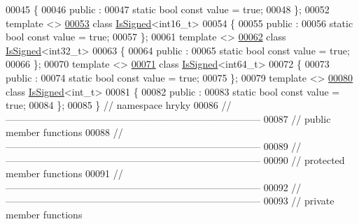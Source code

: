 \begin{DoxyCode}
00045 \{
00046 \textcolor{keyword}{public} :
00047     \textcolor{keyword}{static} \textcolor{keywordtype}{bool} \textcolor{keyword}{const} value = \textcolor{keyword}{true};
00048 \};
00052 \textcolor{keyword}{template} <>
\hypertarget{is__signed_8h_source_l00053}{}\hyperlink{classhryky_1_1_is_signed_3_01int16__t_01_4}{00053} \textcolor{keyword}{class }\hyperlink{classhryky_1_1_is_signed}{IsSigned}<int16\_t>
00054 \{
00055 \textcolor{keyword}{public} :
00056     \textcolor{keyword}{static} \textcolor{keywordtype}{bool} \textcolor{keyword}{const} value = \textcolor{keyword}{true};
00057 \};
00061 \textcolor{keyword}{template} <>
\hypertarget{is__signed_8h_source_l00062}{}\hyperlink{classhryky_1_1_is_signed_3_01int32__t_01_4}{00062} \textcolor{keyword}{class }\hyperlink{classhryky_1_1_is_signed}{IsSigned}<int32\_t>
00063 \{
00064 \textcolor{keyword}{public} :
00065     \textcolor{keyword}{static} \textcolor{keywordtype}{bool} \textcolor{keyword}{const} value = \textcolor{keyword}{true};
00066 \};
00070 \textcolor{keyword}{template} <>
\hypertarget{is__signed_8h_source_l00071}{}\hyperlink{classhryky_1_1_is_signed_3_01int64__t_01_4}{00071} \textcolor{keyword}{class }\hyperlink{classhryky_1_1_is_signed}{IsSigned}<int64\_t>
00072 \{
00073 \textcolor{keyword}{public} :
00074     \textcolor{keyword}{static} \textcolor{keywordtype}{bool} \textcolor{keyword}{const} value = \textcolor{keyword}{true};
00075 \};
00079 \textcolor{keyword}{template} <>
\hypertarget{is__signed_8h_source_l00080}{}\hyperlink{classhryky_1_1_is_signed_3_01int__t_01_4}{00080} \textcolor{keyword}{class }\hyperlink{classhryky_1_1_is_signed}{IsSigned}<int\_t>
00081 \{
00082 \textcolor{keyword}{public} :
00083     \textcolor{keyword}{static} \textcolor{keywordtype}{bool} \textcolor{keyword}{const} value = \textcolor{keyword}{true};
00084 \};
00085 \} \textcolor{comment}{// namespace hryky}
00086 \textcolor{comment}{//
      ------------------------------------------------------------------------------}
00087 \textcolor{comment}{// public member functions}
00088 \textcolor{comment}{//
      ------------------------------------------------------------------------------}
00089 \textcolor{comment}{//
      ------------------------------------------------------------------------------}
00090 \textcolor{comment}{// protected member functions}
00091 \textcolor{comment}{//
      ------------------------------------------------------------------------------}
00092 \textcolor{comment}{//
      ------------------------------------------------------------------------------}
00093 \textcolor{comment}{// private member functions}

\end{DoxyCode}
